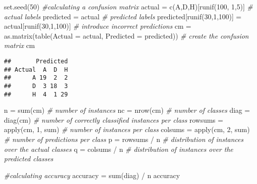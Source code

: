 \documentclass[
]{article}
\newenvironment{Shaded}{\begin{snugshade}}{\end{snugshade}}
\newcommand{\AttributeTok}[1]{\textcolor[rgb]{0.77,0.63,0.00}{#1}}
\newcommand{\CommentTok}[1]{\textcolor[rgb]{0.56,0.35,0.01}{\textit{#1}}}
\newcommand{\DecValTok}[1]{\textcolor[rgb]{0.00,0.00,0.81}{#1}}
\newcommand{\FunctionTok}[1]{\textcolor[rgb]{0.00,0.00,0.00}{#1}}
\newcommand{\NormalTok}[1]{#1}
\newcommand{\OtherTok}[1]{\textcolor[rgb]{0.56,0.35,0.01}{#1}}
\newcommand{\SpecialCharTok}[1]{\textcolor[rgb]{0.00,0.00,0.00}{#1}}
\newcommand{\StringTok}[1]{\textcolor[rgb]{0.31,0.60,0.02}{#1}}
\begin{document}
\begin{Shaded}
\begin{Highlighting}[]
\FunctionTok{set.seed}\NormalTok{(}\DecValTok{50}\NormalTok{)}
\CommentTok{\#calculating a confusion matrix}
\NormalTok{actual }\OtherTok{=} \FunctionTok{c}\NormalTok{(}\StringTok{\textquotesingle{}A\textquotesingle{}}\NormalTok{,}\StringTok{\textquotesingle{}D\textquotesingle{}}\NormalTok{,}\StringTok{\textquotesingle{}H\textquotesingle{}}\NormalTok{)[}\FunctionTok{runif}\NormalTok{(}\DecValTok{100}\NormalTok{, }\DecValTok{1}\NormalTok{,}\DecValTok{5}\NormalTok{)] }\CommentTok{\# actual labels}
\NormalTok{predicted }\OtherTok{=}\NormalTok{ actual }\CommentTok{\# predicted labels}
\NormalTok{predicted[}\FunctionTok{runif}\NormalTok{(}\DecValTok{30}\NormalTok{,}\DecValTok{1}\NormalTok{,}\DecValTok{100}\NormalTok{)] }\OtherTok{=}\NormalTok{ actual[}\FunctionTok{runif}\NormalTok{(}\DecValTok{30}\NormalTok{,}\DecValTok{1}\NormalTok{,}\DecValTok{100}\NormalTok{)]  }\CommentTok{\# introduce incorrect predictions}
\NormalTok{cm }\OtherTok{=} \FunctionTok{as.matrix}\NormalTok{(}\FunctionTok{table}\NormalTok{(}\AttributeTok{Actual =}\NormalTok{ actual, }\AttributeTok{Predicted =}\NormalTok{ predicted)) }\CommentTok{\# create the confusion matrix}
\NormalTok{cm}
\end{Highlighting}
\end{Shaded}

\begin{verbatim}
##       Predicted
## Actual  A  D  H
##      A 19  2  2
##      D  3 18  3
##      H  4  1 29
\end{verbatim}

\begin{Shaded}
\begin{Highlighting}[]
\NormalTok{n }\OtherTok{=} \FunctionTok{sum}\NormalTok{(cm) }\CommentTok{\# number of instances}
\NormalTok{nc }\OtherTok{=} \FunctionTok{nrow}\NormalTok{(cm) }\CommentTok{\# number of classes}
\NormalTok{diag }\OtherTok{=} \FunctionTok{diag}\NormalTok{(cm) }\CommentTok{\# number of correctly classified instances per class }
\NormalTok{rowsums }\OtherTok{=} \FunctionTok{apply}\NormalTok{(cm, }\DecValTok{1}\NormalTok{, sum) }\CommentTok{\# number of instances per class}
\NormalTok{colsums }\OtherTok{=} \FunctionTok{apply}\NormalTok{(cm, }\DecValTok{2}\NormalTok{, sum) }\CommentTok{\# number of predictions per class}
\NormalTok{p }\OtherTok{=}\NormalTok{ rowsums }\SpecialCharTok{/}\NormalTok{ n }\CommentTok{\# distribution of instances over the actual classes}
\NormalTok{q }\OtherTok{=}\NormalTok{ colsums }\SpecialCharTok{/}\NormalTok{ n }\CommentTok{\# distribution of instances over the predicted classes}

\CommentTok{\#calculating accuracy}
\NormalTok{accuracy }\OtherTok{=} \FunctionTok{sum}\NormalTok{(diag) }\SpecialCharTok{/}\NormalTok{ n }
\NormalTok{accuracy  }
\end{Highlighting}
\end{Shaded}
\end{document}
